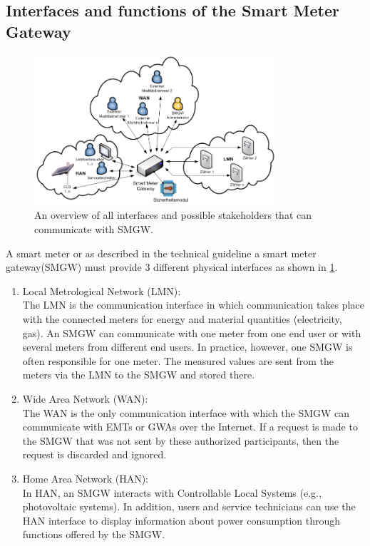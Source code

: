\subsection{Interfaces and functions of the Smart Meter Gateway}
\begin{figure}[tbp]
  \centering
  \includegraphics[width=0.8\textwidth]{images/Smart_Meter_Interfaces.png}
  \caption[Smart Meter Gateway Interfaces]{An overview of all interfaces and possible stakeholders that can communicate with SMGW.}
  \label{fig:Smart_Meter_Interfaces}
\end{figure}
A smart meter or as described in the technical guideline a smart meter gateway(SMGW) must provide 3 different physical interfaces as shown in \ref{fig:Smart_Meter_Interfaces}.
\begin{enumerate}
\item Local Metrological Network (LMN):\\
The LMN is the communication interface in which communication takes place with the connected meters for energy and material quantities (electricity, gas). An SMGW can communicate with one meter from one end user or with several meters from different end users. In practice, however, one SMGW is often responsible for one meter. The measured values are sent from the meters via the LMN to the SMGW and stored there.
\item Wide Area Network (WAN):\\
The WAN is the only communication interface with which the SMGW can communicate with EMTs or GWAs over the Internet. If a request is made to the SMGW that was not sent by these authorized participants, then the request is discarded and ignored.
\item Home Area Network (HAN):\\
In HAN, an SMGW interacts with Controllable Local Systems (e.g., photovoltaic systems). In addition, users and service technicians can use the HAN interface to display information about power consumption through functions offered by the SMGW.
\end{enumerate}
